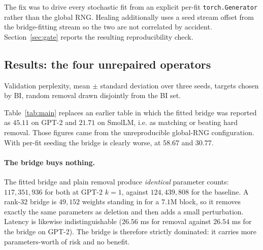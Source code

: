 \documentclass[11pt]{article}
\begin{document}
The fix was to drive every stochastic fit from an explicit per-fit
\texttt{torch.Generator} rather than the global RNG. Healing additionally uses
a seed stream offset from the bridge-fitting stream so the two are not
correlated by accident. Section~\ref{sec:gate} reports the resulting
reproducibility check.

\subsection{Results: the four unrepaired operators}
Validation perplexity, mean $\pm$ standard deviation over three seeds, targets
chosen by BI, random removal drawn disjointly from the BI set.

\begin{table}[h]
\centering
\small
{}
\caption{Validation perplexity on \texttt{wikitext-2-raw-v1}. BI removal is
deterministic given its targets, so its standard deviation is exactly zero;
the bridge and random removal are stochastic because of the fit and the draw.}
\label{tab:main}
\end{table}

Table~\ref{tab:main} replaces an earlier table in which the fitted bridge was
reported as $45.11$ on GPT-2 and $21.71$ on SmolLM, i.e. as matching or
beating hard removal. Those figures came from the unreproducible
global-RNG configuration. With per-fit seeding the bridge is clearly worse, at
$58.67$ and $30.77$.

\paragraph{The bridge buys nothing.} The fitted bridge and plain removal
produce \emph{identical} parameter counts: $117{,}351{,}936$ for both at
GPT-2 $k{=}1$, against $124{,}439{,}808$ for the baseline. A rank-32 bridge is
$49{,}152$ weights standing in for a $7.1$M block, so it removes exactly the
same parameters as deletion and then adds a small perturbation. Latency is
likewise indistinguishable ($26.56$ ms for removal against $26.54$ ms for the
bridge on GPT-2). The bridge is therefore strictly dominated: it carries more
parameters-worth of risk and no benefit.
\end{document}
